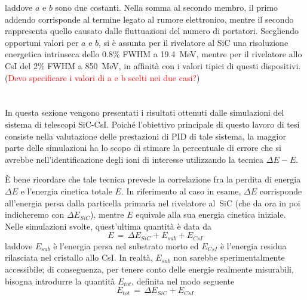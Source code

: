 laddove $a$ e $b$ sono due costanti.
Nella somma al secondo membro, il primo addendo corrisponde al termine legato al rumore elettronico, mentre il secondo rappresenta quello causato dalle fluttuazioni del numero di portatori.
%
%
Scegliendo opportuni valori per $a$ e $b$, si è assunta per il rivelatore al SiC una risoluzione energetica intrinseca dello 0.8\% FWHM a 19.4~MeV, mentre per il rivelatore allo CsI del 2\% FWHM a 850~MeV, in affinità con i valori tipici di questi dispositivi. (\textcolor{red}{Devo specificare i valori di a e b scelti nei due casi?})









\section{}

In questa sezione vengono presentati i risultati ottenuti dalle simulazioni \geant{} del sistema di telescopi SiC-CsI.
Poiché l'obiettivo principale di questo lavoro di tesi consiste nella valutazione delle prestazioni di PID di tale sistema, la maggior parte delle simulazioni ha lo scopo di stimare la percentuale di errore che si avrebbe nell'identificazione degli ioni di interesse utilizzando la tecnica $\Delta E - E$.

È bene ricordare che tale tecnica prevede la correlazione fra la perdita di energia $\Delta E$ e l'energia cinetica totale $E$. In riferimento al caso in esame, $\Delta E$ corrisponde all'energia persa dalla particella primaria nel rivelatore al~SiC (che da ora in poi indicheremo con $ \Delta E_{SiC}$), mentre $E$ equivale alla sua energia cinetica iniziale. Nelle simulazioni svolte, quest'ultima quantità è data da
\begin{equation}
	E \, = \, \Delta E_{SiC} + E_{sub} + E_{CsI}
\end{equation}
laddove $E_{sub}$ è l'energia persa nel substrato morto ed $E_{CsI}$ è l'energia residua rilasciata nel cristallo allo CsI.
In realtà, $E_{sub}$ non sarebbe sperimentalmente accessibile; di conseguenza, per tenere conto delle energie realmente misurabili, bisogna introdurre la quantità $E_{tot}$, definita nel modo seguente
\begin{equation}
	E_{tot} \, = \, \Delta E_{SiC} + E_{CsI}
\end{equation}

